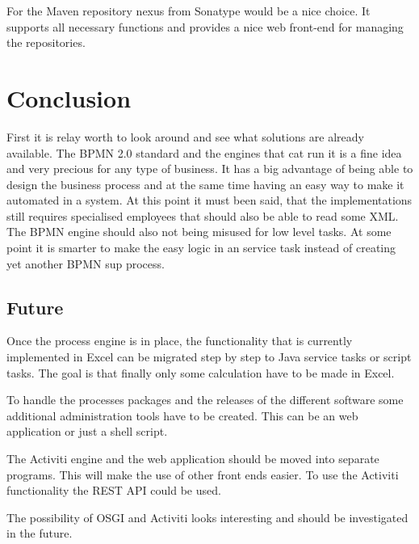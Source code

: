 \documentclass[paper=a4,twoside=false,BCOR=0mm,DIV=calc,fontsize=12pt]{scrartcl}
\begin{document}
For the Maven repository nexus from Sonatype would be a nice choice. It supports all necessary functions and provides a nice web front-end for managing the repositories.





\section{Conclusion}
First it is relay worth to look around and see what solutions are already available. The BPMN 2.0 standard and the engines that cat run it is a fine 
idea and very precious for any type of business. It has a big advantage of being able to design the business process and at the same time having an easy way to make it automated in a system.
At this point it must been said, that the implementations still requires specialised employees that should also be able to read some XML. The BPMN engine should also not being misused for low level tasks. At some point it is smarter to make the easy logic in an service task instead of creating yet another BPMN sup process.




\subsection{Future}
Once the process engine is in place, the functionality that is currently implemented in Excel can be migrated step by step to Java service tasks or script tasks. The goal is that finally only some calculation have to be made in Excel.

To handle the processes packages and the releases of the different software some additional administration tools have to be created. This can be an web application or just a shell script.

The Activiti engine and the web application should be moved into separate programs. This will make the use of other front ends easier. To use the Activiti functionality the REST API could be used.

The possibility of OSGI and Activiti \cite{osgiactivit} looks interesting and should be investigated in the future.



\newpage
\end{document}
